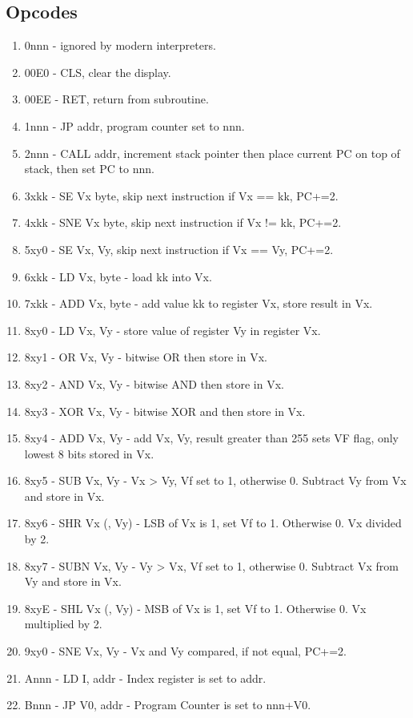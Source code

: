 \documentclass{article}
\begin{document}
\subsection*{Opcodes}
\begin{enumerate}
	\item 0nnn - ignored by modern interpreters.
	\item 00E0 - CLS, clear the display.
	\item 00EE - RET, return from subroutine.
	\item 1nnn - JP addr, program counter set to nnn.
	\item 2nnn - CALL addr, increment stack pointer then place current PC on top of stack, then set PC to nnn.
	\item 3xkk - SE Vx byte, skip next instruction if Vx == kk, PC+=2.
	\item 4xkk - SNE Vx byte, skip next instruction if Vx != kk, PC+=2.
	\item 5xy0 - SE Vx, Vy, skip next instruction if Vx == Vy, PC+=2.
	\item 6xkk - LD Vx, byte - load kk into Vx.
	\item 7xkk - ADD Vx, byte - add value kk to register Vx, store result in Vx.
	\item 8xy0 - LD Vx, Vy - store value of register Vy in register Vx.
	\item 8xy1 - OR Vx, Vy - bitwise OR then store in Vx.
	\item 8xy2 - AND Vx, Vy - bitwise AND then store in Vx.
	\item 8xy3 - XOR Vx, Vy - bitwise XOR and then store in Vx.
	\item 8xy4 - ADD Vx, Vy - add Vx, Vy, result greater than 255 sets VF flag, only lowest 8 bits stored in Vx.
	\item 8xy5 - SUB Vx, Vy - Vx > Vy, Vf set to 1, otherwise 0. Subtract Vy from Vx and store in Vx.
	\item 8xy6 - SHR Vx (, Vy) - LSB of Vx is 1, set Vf to 1. Otherwise 0. Vx divided by 2.
	\item 8xy7 - SUBN Vx, Vy - Vy > Vx, Vf set to 1, otherwise 0. Subtract Vx from Vy and store in Vx. 
	\item 8xyE - SHL Vx (, Vy) - MSB of Vx is 1, set Vf to 1. Otherwise 0. Vx multiplied by 2.
	\item 9xy0 - SNE Vx, Vy - Vx and Vy compared, if not equal, PC+=2.
	\item Annn - LD I, addr - Index register is set to addr.
	\item Bnnn - JP V0, addr - Program Counter is set to nnn+V0.

\end{enumerate}
\end{document}
